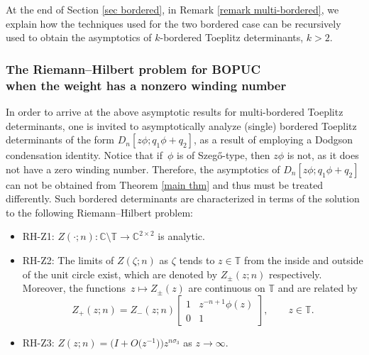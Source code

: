 \documentclass[pdftex]{sigma}
\numberwithin{equation}{section}
\newcommand{\C}{{\mathbb C}}
\newcommand{\T}{{\mathbb T}}
\newcommand{\ze}{\zeta}
\begin{document}
	At the end of Section \ref{sec bordered}, in Remark \ref{remark multi-bordered}, we explain how the techniques used for the two bordered case can be recursively used to obtain the asymptotics of $k$-bordered Toeplitz determinants, $k>2$.
	
	\subsubsection[The Riemann--Hilbert problem for BOPUC when the weight has\\ a nonzero winding number]{The Riemann--Hilbert problem for BOPUC\\ when the weight has a nonzero winding number}
	In order to arrive at the above asymptotic results for multi-bordered Toeplitz determinants, one is invited to asymptotically analyze (single) bordered Toeplitz determinants of the form $D_n[z\phi;q_1 \phi + q_2]$, as a result of employing a Dodgson condensation identity. Notice that if~$\phi$ is of Szeg\H{o}-type, then $z \phi$ is not, as it does not have a zero winding number. Therefore, the asymptotics of $D_n[z\phi;q_1 \phi + q_2]$ can not be obtained from Theorem \ref{main thm} and thus must be treated differently. Such bordered determinants are characterized in terms of the solution to the following Riemann--Hilbert problem:
	\begin{itemize}\itemsep=0pt
		\item RH-Z1: %
$Z(\cdot;n)\colon\C\setminus \T \to \C^{2\times2}$ is analytic.
		\item RH-Z2: %
The limits of $Z(\ze;n)$ as $\ze$ tends to $z \in \T $ from the inside and outside of the unit circle exist, which are denoted by $Z_{\pm}(z;n)$ respectively. Moreover, the functions~${z \mapsto Z_{\pm}(z)}$ are continuous on $\T$ and are related by
		\begin{equation*}
			Z_+(z;n)=Z_-(z;n)\begin{bmatrix}
				1 & z^{-n+1}\phi(z) \\
				0 & 1
			\end{bmatrix}, \qquad z \in \T.
		\end{equation*}
		
		\item RH-Z3: %
$Z(z;n)=\big( I + O\big(z^{-1}\big) \big) z^{n \sigma_3}$ as $z \to \infty$.
	\end{itemize}
\end{document}
